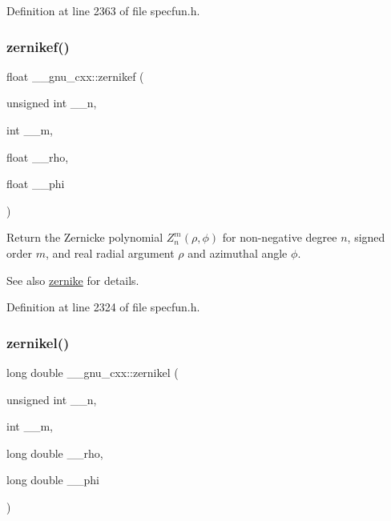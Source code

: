 Definition at line 2363 of file specfun.\+h.

\mbox{\label{group__gnu__math__spec__func_gababce1066ecef7258070b9b7fcea975f}} 
\subsubsection{\texorpdfstring{zernikef()}{zernikef()}}
{\footnotesize\ttfamily float \+\_\+\+\_\+gnu\+\_\+cxx\+::zernikef (\begin{DoxyParamCaption}\item[{unsigned int}]{\+\_\+\+\_\+n,  }\item[{int}]{\+\_\+\+\_\+m,  }\item[{float}]{\+\_\+\+\_\+rho,  }\item[{float}]{\+\_\+\+\_\+phi }\end{DoxyParamCaption})\hspace{0.3cm}{\ttfamily [inline]}}

Return the Zernicke polynomial $ Z_n^m(\rho,\phi) $ for non-\/negative degree $ n $, signed order $ m $, and real radial argument $ \rho $ and azimuthal angle $ \phi $.

\begin{DoxySeeAlso}{See also}
\hyperlink{group__gnu__math__spec__func_gaaed33f29c1eb1d2c5b9590fe2e57151c}{zernike} for details. 
\end{DoxySeeAlso}


Definition at line 2324 of file specfun.\+h.

\mbox{\label{group__gnu__math__spec__func_ga9236dd8545b448da9cb05dd8b7cf6811}} 
\subsubsection{\texorpdfstring{zernikel()}{zernikel()}}
{\footnotesize\ttfamily long double \+\_\+\+\_\+gnu\+\_\+cxx\+::zernikel (\begin{DoxyParamCaption}\item[{unsigned int}]{\+\_\+\+\_\+n,  }\item[{int}]{\+\_\+\+\_\+m,  }\item[{long double}]{\+\_\+\+\_\+rho,  }\item[{long double}]{\+\_\+\+\_\+phi }\end{DoxyParamCaption})\hspace{0.3cm}{\ttfamily [inline]}}

